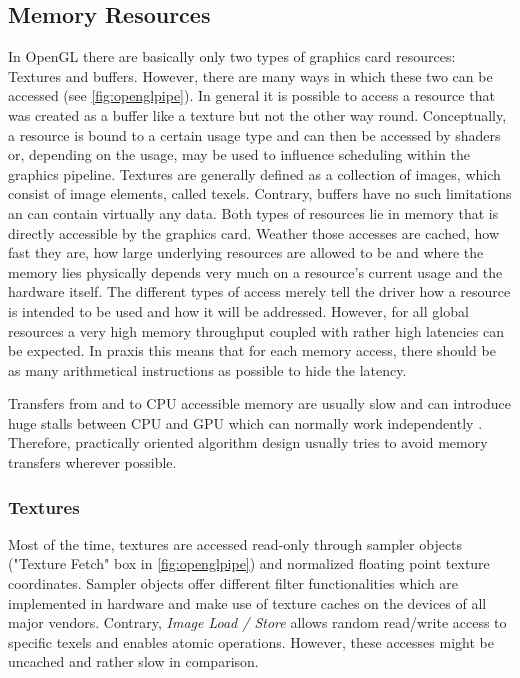 \documentclass[thesis.tex]{subfiles}
\begin{document}
\subsection{Memory Resources} \label{sec:preq:memory}
In OpenGL there are basically only two types of graphics card resources: Textures and buffers.
However, there are many ways in which these two can be accessed (see \autoref{fig:openglpipe}).
In general it is possible to access a resource that was created as a buffer like a texture but not the other way round.
Conceptually, a resource is bound to a certain usage type and can then be accessed by shaders or, depending on the usage, may be used to influence scheduling within the graphics pipeline.
Textures are generally defined as a collection of images, which consist of image elements, called texels. %
Contrary, buffers have no such limitations an can contain virtually any data.
Both types of resources lie in memory that is directly accessible by the graphics card.
Weather those accesses are cached, how fast they are, how large underlying resources are allowed to be and where the memory lies physically depends very much on a resource's current usage and the hardware itself.
The different types of access merely tell the driver how a resource is intended to be used and how it will be addressed.
However, for all global resources a very high memory throughput coupled with rather high latencies can be expected.
In praxis this means that for each memory access, there should be as many arithmetical instructions as possible to hide the latency.

Transfers from and to CPU accessible memory are usually slow and can introduce huge stalls between CPU and GPU which can normally work independently \cite{bib:openglinsightstransfer}.
Therefore, practically oriented algorithm design usually tries to avoid memory transfers wherever possible.

\subsubsection{Textures}
Most of the time, textures are accessed read-only through sampler objects ("Texture Fetch" box in \autoref{fig:openglpipe}) and normalized floating point texture coordinates.
Sampler objects offer different filter functionalities which are implemented in hardware and make use of texture caches on the devices of all major vendors.
Contrary, \emph{Image Load / Store} allows random read/write access to specific texels and enables atomic operations.
However, these accesses might be uncached and rather slow in comparison.
\end{document}
